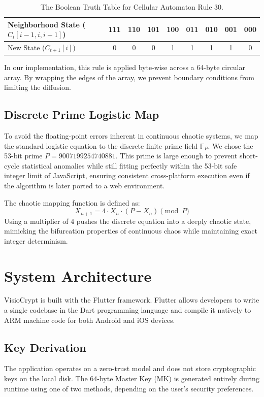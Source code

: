 \documentclass[runningheads]{llncs}
\begin{document}
\begin{table}[h]
\centering
\caption{The Boolean Truth Table for Cellular Automaton Rule 30.}
\begin{tabular}{lcccccccc}
\toprule
Neighborhood State ($C_t[i-1, i, i+1]$) & 111 & 110 & 101 & 100 & 011 & 010 & 001 & 000 \\ \midrule
New State ($C_{t+1}[i]$)                & 0   & 0   & 0   & 1   & 1   & 1   & 1   & 0   \\ \bottomrule
\end{tabular}
\end{table}

In our implementation, this rule is applied byte-wise across a 64-byte circular array. By wrapping the edges of the array, we prevent boundary conditions from limiting the diffusion.

\subsection{Discrete Prime Logistic Map}
To avoid the floating-point errors inherent in continuous chaotic systems, we map the standard logistic equation to the discrete finite prime field $\mathbb{F}_P$. We chose the 53-bit prime $P = 9007199254740881$. This prime is large enough to prevent short-cycle statistical anomalies while still fitting perfectly within the 53-bit safe integer limit of JavaScript, ensuring consistent cross-platform execution even if the algorithm is later ported to a web environment.

The chaotic mapping function is defined as:
\begin{equation}
X_{n+1} = 4 \cdot X_n \cdot (P - X_n) \pmod P
\end{equation}
Using a multiplier of 4 pushes the discrete equation into a deeply chaotic state, mimicking the bifurcation properties of continuous chaos while maintaining exact integer determinism.

\section{System Architecture}
VisioCrypt is built with the Flutter framework. Flutter allows developers to write a single codebase in the Dart programming language and compile it natively to ARM machine code for both Android and iOS devices.

\subsection{Key Derivation}
The application operates on a zero-trust model and does not store cryptographic keys on the local disk. The 64-byte Master Key (MK) is generated entirely during runtime using one of two methods, depending on the user's security preferences.
\end{document}
